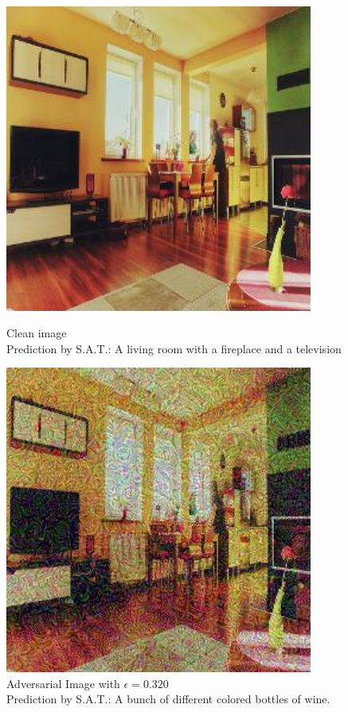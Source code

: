 \begin{figure}[ht]
    \centering
    \begin{minipage}{0.45\textwidth}
        \centering
        \includegraphics[width=0.9\textwidth]{../code/ShowDistractAndDeceive/samples/0.000/img_0.jpg} %
        \caption*{Clean image\\Prediction by S.A.T.: A living room with a fireplace and a television}
    \end{minipage}\hfill
    \begin{minipage}{0.45\textwidth}
        \centering
        \includegraphics[width=0.9\textwidth]{../code/ShowDistractAndDeceive/samples/0.320/img_0.jpg} %
        \caption*{Adversarial Image with $\epsilon=0.320$\\Prediction by S.A.T.: A bunch of different colored bottles of wine.}
    \end{minipage}
\end{figure}